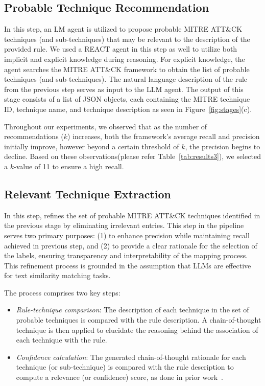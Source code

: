 \subsection{Probable Technique Recommendation}

In this step, an LM agent is utilized to propose probable MITRE ATT\&CK techniques (and sub-techniques) that may be relevant to the description of the provided rule.
We used a REACT agent in this step as well to utilize both implicit and explicit knowledge during reasoning.
For explicit knowledge, the agent searches the MITRE ATT\&CK framework to obtain the list of probable techniques (and sub-techniques).
The natural language description of the rule from the previous step serves as input to the LLM agent.
The output of this stage consists of a list of JSON objects, each containing the MITRE technique ID, technique name, and technique description as seen in Figure~\ref{fig:stages}(c).

Throughout our experiments, we observed that as the number of recommendations ($k$) increases, both the framework's average recall and precision initially improve, however beyond a certain threshold of $k$, the %
precision begins to decline.
Based on these observations(please refer Table~\ref{tab:results3}), we selected a $k$-value of 11 to ensure a high recall.



\subsection{Relevant Technique Extraction}
In this step, \methodName refines the set of probable MITRE ATT\&CK techniques identified in the previous stage by eliminating irrelevant entries.
This step in the pipeline serves two primary purposes: (1) to enhance precision while maintaining recall achieved in previous step, and (2) to provide a clear rationale for the selection of the labels, ensuring transparency and interpretability of the mapping process.
This refinement process is grounded in the assumption that LLMs are effective for text similarity matching tasks.

The process comprises two key steps:
\begin{itemize}
    \item \textit{Rule-technique comparison}: The description of each technique in the set of probable techniques is compared with the rule description. 
    A chain-of-thought technique is then applied to elucidate the reasoning behind the association of each technique with the rule.
    \item \textit{Confidence calculation}: The generated chain-of-thought rationale for each technique (or sub-technique) is compared with the rule description to compute a relevance (or confidence) score, as done in prior work~\cite{freitas2024ai}.
\end{itemize}

